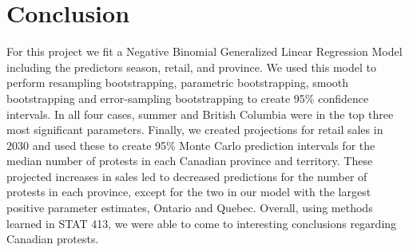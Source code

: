 \documentclass[12pt]{article}
\begin{document}
\newpage
\section{Conclusion}
For this project we fit a Negative Binomial Generalized Linear Regression Model including the predictors season, retail, and province. We used this model to perform resampling bootstrapping, parametric bootstrapping, smooth bootstrapping and error-sampling bootstrapping to create 95\% confidence intervals. In all four cases, summer and British Columbia were in the top three most significant parameters. Finally, we created projections for retail sales in 2030 and used these to create 95\% Monte Carlo prediction intervals for the median number of protests in each Canadian province and territory. These projected increases in sales led to decreased predictions for the number of protests in each province, except for the two in our model with the largest positive parameter estimates, Ontario and Quebec.
Overall, using methods learned in STAT 413, we were able to come to interesting conclusions regarding Canadian protests.
\end{document}
